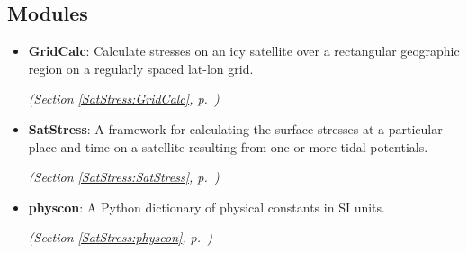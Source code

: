 
\subsection{Modules}

\begin{itemize}
\setlength{\parskip}{0ex}
\item \textbf{GridCalc}: Calculate stresses on an icy satellite over a rectangular geographic region
on a regularly spaced lat-lon grid.



  \textit{(Section \ref{SatStress:GridCalc}, p.~\pageref{SatStress:GridCalc})}

\item \textbf{SatStress}: A framework for calculating the surface stresses at a particular place and 
time on a satellite resulting from one or more tidal potentials.



  \textit{(Section \ref{SatStress:SatStress}, p.~\pageref{SatStress:SatStress})}

\item \textbf{physcon}: A Python dictionary of physical constants in SI units.



  \textit{(Section \ref{SatStress:physcon}, p.~\pageref{SatStress:physcon})}

\end{itemize}

